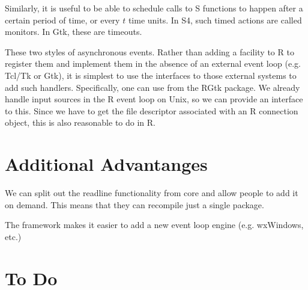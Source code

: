 \documentclass{article}
\begin{document}
Similarly, it is useful to be able to schedule calls to S functions to
happen after a certain period of time, or every $t$ time units.  In
S4, such timed actions are called monitors. In Gtk, these are
timeouts.

These two styles of asynchronous events.  Rather than adding a
facility to R to register them and implement them in the absence of an
external event loop (e.g. Tcl/Tk or Gtk), it is simplest to use the
interfaces to those external systems to add such handlers.
Specifically, one can use  from the RGtk
package.  We already handle input sources in the R event loop on Unix,
so we can provide an interface to this.  Since we have to get the file
descriptor associated with an R connection object, this is also
reasonable to do in R.


\section{Additional Advantanges}

We can split out the readline functionality from core and allow people
to add it on demand.  This means that they can recompile just a single
package.

The framework makes it easier to add a new event loop engine (e.g.
wxWindows, etc.)



\section{To Do}
\end{document}
